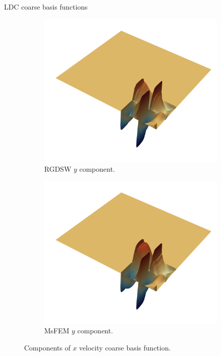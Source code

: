 \begin{frame}[noframenumbering]{LDC coarse basis functions}
	\begin{figure}
		\centering
		\begin{subfigure}{0.5\textwidth}
			\includegraphics[width=\textwidth]{images/RGDSW-y}
			\caption{RGDSW $y$ component.}
		\end{subfigure}%
		\begin{subfigure}{0.5\textwidth}
			\includegraphics[width=\textwidth]{images/MsFEM-y}
			\caption{MsFEM $y$ component.}
		\end{subfigure}
		\caption{Components of $x$ velocity coarse basis function.}
	\end{figure}
\end{frame}

